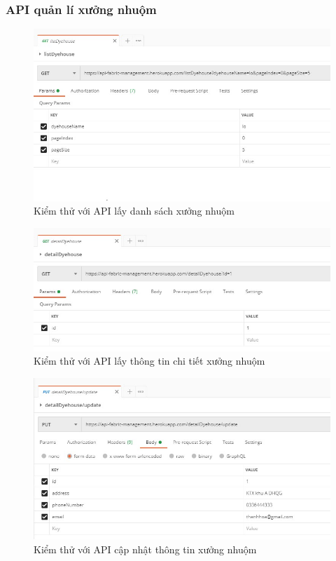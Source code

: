 \subsubsection{API quản lí xưởng nhuộm}
\begin{figure}[H]
    \begin{center}
        \includegraphics[width=12cm]{Image/API/7_listDyehouse.jpg}
        \caption{Kiểm thử với API lấy danh sách xưởng nhuộm}
        \label{listDyehouse}
    \end{center}
\end{figure}
\begin{figure}[H]
    \begin{center}
        \includegraphics[width=12cm]{Image/API/8_detailDyehouse.jpg}
        \caption{Kiểm thử với API lấy thông tin chi tiết xưởng nhuộm}
        \label{detailDyehouse}
    \end{center}
\end{figure}
\begin{figure}[H]
    \begin{center}
        \includegraphics[width=12cm]{Image/API/9_updateDyehouse.jpg}
        \caption{Kiểm thử với API cập nhật thông tin xưởng nhuộm}
        \label{updateDyehouse}
    \end{center}
\end{figure}
